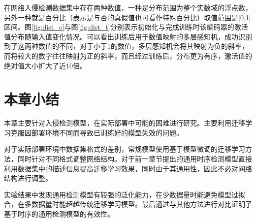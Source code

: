 在网络入侵检测数据集中存在两种数值，一种是分布范围为整个实数域的浮点数，另外一种就是百分比（表示是与否的真假值也可看作特殊百分比）取值范围是[0,1]区间。图\ref{fig:dist_o}与图\ref{fig:dist_t}分别表示初始化与完成训练时该编码器的激活值分布随输入值变化情况。可以看出训练后用于数值映射的多层感知机，成功识别到了这两种数值的不同，对于小于1的数值，多层感知机会将其映射为负的斜率，而将较大的数字往往映射为正的斜率，而且经过训练后，分布更为有序，激活值的绝对值大小扩大了近10倍。


\section{本章小结}

本章主要针对入侵检测模型，在实际部署中可能的困难进行研究。主要利用迁移学习克服因部署环境不同而导致已训练好的模型失效的问题。

对于实际部署环境中数据集格式的差别，常规模型使用基于模型微调的迁移学习方法，同时针对不同格式调整网络结构。对于前一章节提出的通用时序检测模型直接利用数据集中的描述信息提高迁移学习效果，同时由于其通用性，因此不必对网络结构进行调整。

实验结果中发现通用检测模型有较强的泛化能力，在少数据量时能避免模型过拟合，在多数据量时能超越传统迁移学习模型。最后通过与其他方法进行对比证明了基于时序的通用检测模型的有效性。